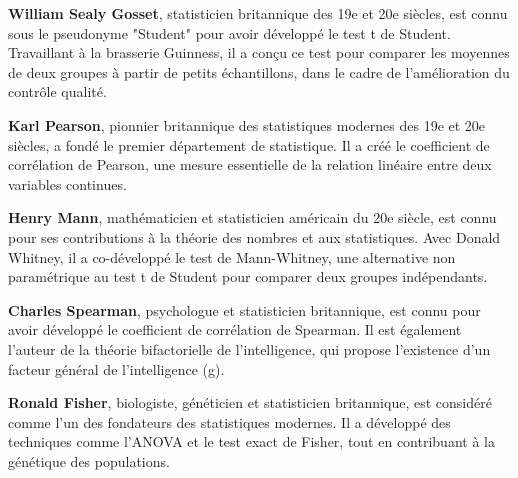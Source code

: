 \begin{thebibliography}{9}
\textbf{William Sealy Gosset}, statisticien britannique des 19e et 20e siècles, est connu sous le pseudonyme "Student" pour avoir développé le test t de Student. Travaillant à la brasserie Guinness, il a conçu ce test pour comparer les moyennes de deux groupes à partir de petits échantillons, dans le cadre de l'amélioration du contrôle qualité. 

\textbf{Karl Pearson}, pionnier britannique des statistiques modernes des 19e et 20e siècles, a fondé le premier département de statistique. Il a créé le coefficient de corrélation de Pearson, une mesure essentielle de la relation linéaire entre deux variables continues.

\textbf{Henry Mann}, mathématicien et statisticien américain du 20e siècle, est connu pour ses contributions à la théorie des nombres et aux statistiques. Avec Donald Whitney, il a co-développé le test de Mann-Whitney, une alternative non paramétrique au test t de Student pour comparer deux groupes indépendants.

\textbf{Charles Spearman}, psychologue et statisticien britannique, est connu pour avoir développé le coefficient de corrélation de Spearman. Il est également l’auteur de la théorie bifactorielle de l'intelligence, qui propose l’existence d’un facteur général de l’intelligence (g).

\textbf{Ronald Fisher}, biologiste, généticien et statisticien britannique, est considéré comme l'un des fondateurs des statistiques modernes. Il a développé des techniques comme l'ANOVA et le test exact de Fisher, tout en contribuant à la génétique des populations.

\end{thebibliography} 

